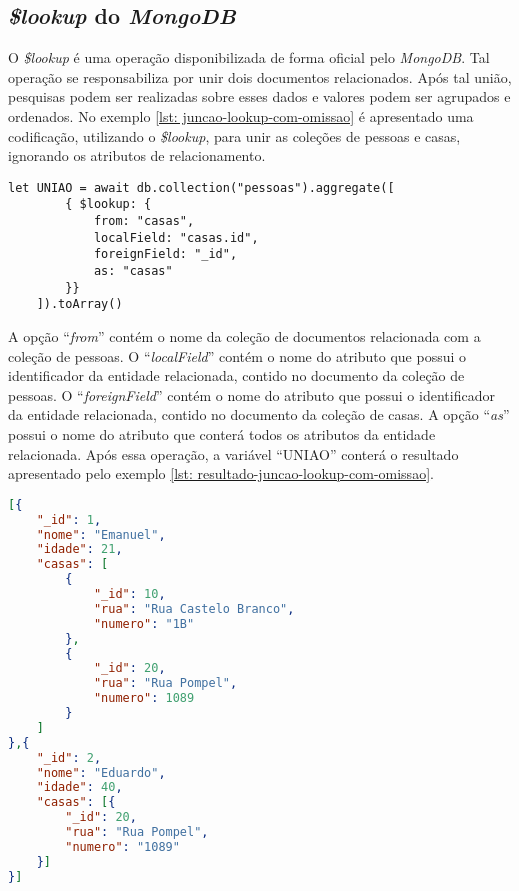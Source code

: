 \subsection{\textit{\$lookup} do \textit{MongoDB}}

O \textit{\$lookup} é uma operação disponibilizada de forma oficial pelo \textit{MongoDB}. Tal operação se responsabiliza por unir dois documentos relacionados. Após tal união, pesquisas podem ser realizadas sobre esses dados e valores podem ser agrupados e ordenados. No exemplo \ref{lst: juncao-lookup-com-omissao} é apresentado uma codificação, utilizando o \textit{\$lookup}, para unir as coleções de pessoas e casas, ignorando os atributos de relacionamento.


\begin{lstlisting}[style=ES6, caption={Junção de Documentos com Omissão\label{lst: juncao-lookup-com-omissao}}]
    let UNIAO = await db.collection("pessoas").aggregate([
        { $lookup: {
            from: "casas",
            localField: "casas.id",
            foreignField: "_id",
            as: "casas"
        }}
    ]).toArray()
\end{lstlisting}

A opção ``\textit{from}'' contém o nome da coleção de documentos relacionada com a coleção de pessoas. O ``\textit{localField}'' contém o nome do atributo que possui o identificador da entidade relacionada, contido no documento da coleção de pessoas. O ``\textit{foreignField}'' contém o nome do atributo que possui o identificador da entidade relacionada, contido no documento da coleção de casas. A opção ``\textit{as}'' possui o nome do atributo que conterá todos os atributos da entidade relacionada. Após essa operação, a  variável ``UNIAO'' conterá o resultado apresentado pelo exemplo \ref{lst: resultado-juncao-lookup-com-omissao}.


\begin{lstlisting}[language=json, caption={Resultado da Junção com Omissão\label{lst: resultado-juncao-lookup-com-omissao}}]
[{
    "_id": 1,
    "nome": "Emanuel",
    "idade": 21,
    "casas": [
        {
            "_id": 10,
            "rua": "Rua Castelo Branco",
            "numero": "1B"
        },
        {
            "_id": 20,
            "rua": "Rua Pompel",
            "numero": 1089
        }
    ]
},{
    "_id": 2,
    "nome": "Eduardo",
    "idade": 40,
    "casas": [{
        "_id": 20,
        "rua": "Rua Pompel",
        "numero": "1089"
    }]
}]
\end{lstlisting}

